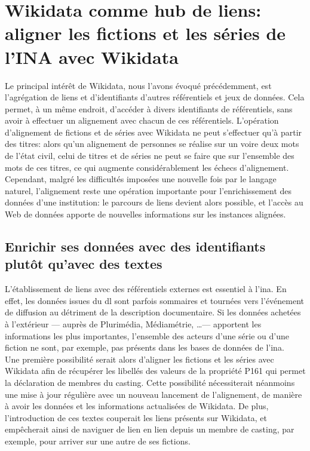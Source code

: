 \section{\label{III-A-3}Wikidata comme hub de liens: aligner les fictions et les séries de l'INA avec Wikidata}

Le principal intérêt de Wikidata, nous l'avons évoqué précédemment, est l'agrégation de liens et d'identifiants d'autres référentiels et jeux de données. Cela permet, à un même endroit, d'accéder à divers identifiants de référentiels, sans avoir à effectuer un alignement avec chacun de ces référentiels. L'opération d'alignement de fictions et de séries avec Wikidata ne peut s'effectuer qu'à partir des titres: alors qu'un alignement de personnes se réalise sur un voire deux mots de l'état civil, celui de titres et de séries ne peut se faire que sur l'ensemble des mots de ces titres, ce qui augmente considérablement les échecs d'alignement.\\

Cependant, malgré les difficultés imposées une nouvelle fois par le langage naturel, l'alignement reste une opération importante pour l'enrichissement des données d'une institution: le parcours de liens devient alors possible, et l'accès au Web de données apporte de nouvelles informations sur les instances alignées.

\subsection{\label{III-A-3-a}Enrichir ses données avec des identifiants plutôt qu'avec des textes}

L'établissement de liens avec des référentiels externes est essentiel à l'\ac{ina}. En effet, les données issues du \ac{dl} sont parfois sommaires et tournées vers l'événement de diffusion au détriment de la description documentaire. Si les données achetées à l'extérieur --- auprès de Plurimédia, Médiamétrie, \dots --- apportent les informations les plus importantes, l'ensemble des acteurs d'une série ou d'une fiction ne sont, par exemple, pas présents dans les bases de données de l'\ac{ina}.\\

Une première possibilité serait alors d'aligner les fictions et les séries avec Wikidata afin de récupérer les libellés des valeurs de la propriété P161 qui permet la déclaration de membres du casting. Cette possibilité nécessiterait néanmoins une mise à jour régulière avec un nouveau lancement de l'alignement, de manière à avoir les données et les informations actualisées de Wikidata. De plus, l'introduction de ces textes couperait les liens présents sur Wikidata, et empêcherait ainsi de naviguer de lien en lien depuis un membre de casting, par exemple, pour arriver sur une autre de ses fictions.\\

